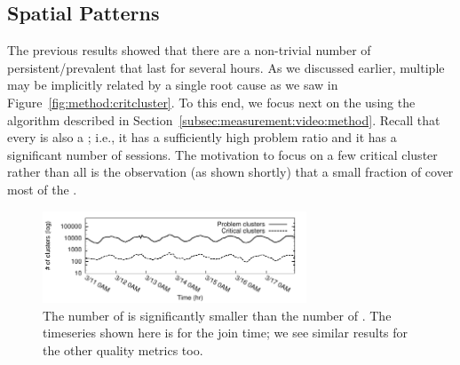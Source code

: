 \subsection{Spatial Patterns}
\label{subsec:measurement:video:spatial}

The previous results showed that there are a non-trivial 
number of persistent/prevalent \problemclusters that last for
several hours. 
As we discussed earlier,  multiple \problemclusters may 
be implicitly related by a single root cause as we saw in
Figure~\ref{fig:method:critcluster}.  
To this end, we focus next on the \criticalclusters using the 
algorithm described in 
Section~\ref{subsec:measurement:video:method}. 
Recall that every  \criticalclusters is also a \problemcluster; 
i.e.,  it has a sufficiently high problem ratio and it has a 
significant number of sessions. The motivation to focus on 
a few critical cluster rather than all \problemclusters is the 
observation (as shown shortly) that a small fraction of 
\problemclusters cover most of the \problemsessions.

\begin{figure}[t]
\centering
   \includegraphics[width=0.7\textwidth] {figures/conext13-time-cluster-count-join-time.pdf}
\caption{The number of \criticalclusters is significantly  
smaller than the number of \problemclusters. 
The timeseries shown here  is for the join time; we see 
similar  results for the other quality metrics too.}
\label{fig:critical:reduction}
\end{figure}


